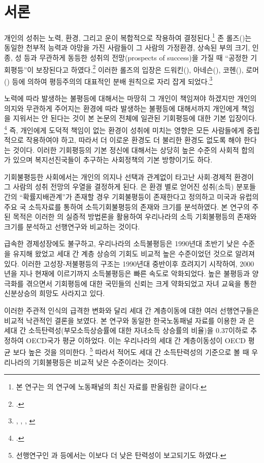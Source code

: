 \section{서론}

개인의 성취는 노력, 환경, 그리고 운이 복합적으로 작용하여 결정된다.\footnote{본 연구는 \citet{onj17}의 연구에 노동패널의 최신 자료를 판올림한 글이다.} 존 롤즈(\citeauthor{Rawls99})는 동일한 천부적 능력과 야망을 가진 사람들이 그 사람의 가정환경, 상속된 부의 크기, 인종, 성 등과 무관하게 동등한 성취의 전망(prospects of success)을 가질 때 ``공정한 기회평등''이 보장된다고 하였다.\footcite[p. 63.]{Rawls99} 이러한 롤즈의 입장은 드워킨(\citeauthor{dworkin81a}), 아네슨(\citeauthor{arneson91}), 코헨(\citeauthor{cohen89}), 로머(\citeauthor{Roemer98}) 등에 의하여 평등주의의 대표적인 분배 원칙으로 자리 잡게 되었다.\footnote{\citet{dworkin81a, dworkin81b}, \citet{arneson91}, \citet{cohen89}, \citet{Roemer98}}

노력에 따라 발생하는 불평등에 대해서는 마땅히 그 개인이 책임져야 하겠지만 개인의 의지와 무관하게 주어지는 환경에 따라 발생하는 불평등에 대해서까지 개인에게 책임을 지워서는 안 된다는 것이 본 논문의 전체에 일관된 기회평등에 대한 기본 입장이다. \footcite[p.5.]{Roemer98} 즉, 개인에게 도덕적 책임이 없는 환경이 성취에 미치는 영향은 모든 사람들에게 중립적으로 작용하여야 하고, 따라서 더 이로운 환경도 더 불리한 환경도 없도록 해야 한다는 것이다. 이러한 기회평등의 기본 정신에 대해서는 상당히 높은 수준의 사회적 합의가 있으며 복지선진국들이 추구하는 사회정책의 기본 방향이기도 하다.

기회불평등한 사회에서는 개인의 의지나 선택과 관계없이 타고난 사회$\cdot$경제적 환경이 그 사람의 성취 전망의 우열을 결정하게 된다. \citet{letl08, letl09}은 환경 별로 얻어진 성취(소득) 분포들 간의 ``확률지배관계''가 존재할 경우 기회불평등이 존재한다고 정의하고 미국과 유럽의 주요 국 소득자료를 통하여 소득기회불평등의 존재와 크기를 분석하였다. 본 연구의 주된 목적은 이러한 \citeauthor{letl08}의 실증적 방법론을 활용하여 우리나라의 소득 기회불평등의 존재와 크기를 분석하고 선행연구와 비교하는 것이다.

급속한 경제성장에도 불구하고, 우리나라의 소득불평등은 1990년대 초반기 낮은 수준을 유지해 왔었고 세대 간 계층 상승의 기회도 비교적 높은 수준이었던 것으로 알려져 있다. 이러한 고성장-저불평등의 구조는 1990년대 중반이후 흐려지기 시작하여, 2000년을 지나 현재에 이르기까지 소득불평등은 빠른 속도로 악화되었다. 높은 불평등과 양극화를 겪으면서 기회평등에 대한 국민들의 신뢰는 크게 약화되었고 자녀 교육을 통한 신분상승의 희망도 사라지고 있다.

이러한 주관적 인식의 급격한 변화와 달리 세대 간 계층이동에 대한 여러 선행연구들은 비교적 낙관적인 결론을 보였다. 본 연구와 동일한 한국노동패널 자료를 이용한 \citet{cnh11}과 \citet{yang12}은 세대 간 소득탄력성(부모소득상승률에 대한 자녀소득 상승률의 비율)을 0.37이하로 추정하여 OECD국가 평균 이하었다. 이는 우리나라의 세대 간 계층이동성이 OECD 평균 보다 높은 것을 의미한다. \footnote{선행연구인 \citet{kim09}과 \citet{ketl09} 등에서는 이보다 더 낮은 탄력성이 보고되기도 하였다.} 따라서 적어도 세대 간 소득탄력성의 기준으로 볼 때 우리나라의 기회불평등은 비교적 낮은 수준이라는 것이다.

